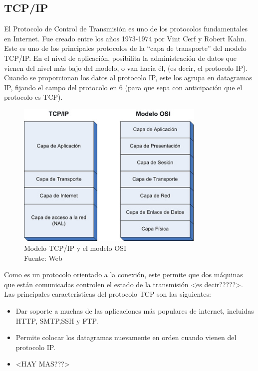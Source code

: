 \subsection{TCP/IP}
El Protocolo de Control de Transmisión es uno de los protocolos fundamentales en Internet. Fue creado entre los años 1973-1974 por Vint Cerf y Robert Kahn. Este es uno de los principales protocolos de la ``capa de transporte'' del modelo TCP/IP. En el nivel de aplicación, posibilita la administración de datos que vienen del nivel más bajo del modelo, o van hacia él, (es decir, el protocolo IP). Cuando se proporcionan los datos al protocolo IP, este los agrupa en datagramas IP, fijando el campo del protocolo en 6 (para que sepa con anticipación que el protocolo es TCP). \\


\begin{figure}[H]
    \begin{center}
        \includegraphics[width=9cm]{img/capitulo_2/tcp_ip_osi.jpg}
    \end{center}
    \caption{Modelo TCP/IP y el modelo OSI\\Fuente: Web}
    \label{fig:sistema_video_vigilancia}
\end{figure}

Como es un protocolo orientado a la conexión, este permite que dos máquinas que están comunicadas controlen el estado de la transmisión <es decir?????>. Las principales características del protocolo TCP son las siguientes: 

\begin{itemize}
    \item Dar soporte a muchas de las aplicaciones más populares de internet, incluidas HTTP, SMTP,SSH y FTP. 
    \item Permite colocar los datagramas nuevamente en orden cuando vienen del protocolo IP.
    \item <HAY MAS???>
\end{itemize}

